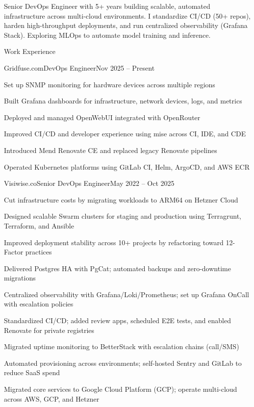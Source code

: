 \documentclass[]{main}
\begin{document}
\resumeheader
{\address{Leipzig, Germany}}
{}
{}
{}
{}
{}

Senior DevOps Engineer with 5+ years building scalable, automated infrastructure across multi-cloud environments. I standardize CI/CD (50+ repos), harden high-throughput deployments, and run centralized observability (Grafana Stack). Exploring MLOps to automate model training and inference.

\begin{section}{Work Experience}
  \begin{subsection}{Gridfuse.com}{DevOps Engineer}{Nov 2025 -- Present}{}
     \item Set up SNMP monitoring for hardware devices across multiple regions
     \item Built Grafana dashboards for infrastructure, network devices, logs, and metrics
     \item Deployed and managed OpenWebUI integrated with OpenRouter
     \item Improved CI/CD and developer experience using mise across CI, IDE, and CDE
     \item Introduced Mend Renovate CE and replaced legacy Renovate pipelines
     \item Operated Kubernetes platforms using GitLab CI, Helm, ArgoCD, and AWS ECR
 \end{subsection}

 \begin{subsection}{Visiwise.co}{Senior DevOps Engineer}{May 2022 -- Oct 2025}{}
     \item Cut infrastructure costs by migrating workloads to ARM64 on Hetzner Cloud
     \item Designed scalable Swarm clusters for staging and production using Terragrunt, Terraform, and Ansible
     \item Improved deployment stability across 10+ projects by refactoring toward 12-Factor practices
     \item Delivered Postgres HA with PgCat; automated backups and zero-downtime migrations
     \item Centralized observability with Grafana/Loki/Prometheus; set up Grafana OnCall with escalation policies
     \item Standardized CI/CD; added review apps, scheduled E2E tests, and enabled Renovate for private registries
     \item Migrated uptime monitoring to BetterStack with escalation chains (call/SMS)
     \item Automated provisioning across environments; self-hosted Sentry and GitLab to reduce SaaS spend
     \item Migrated core services to Google Cloud Platform (GCP); operate multi-cloud across AWS, GCP, and Hetzner
 \end{subsection}


\end{section}
\end{document}
